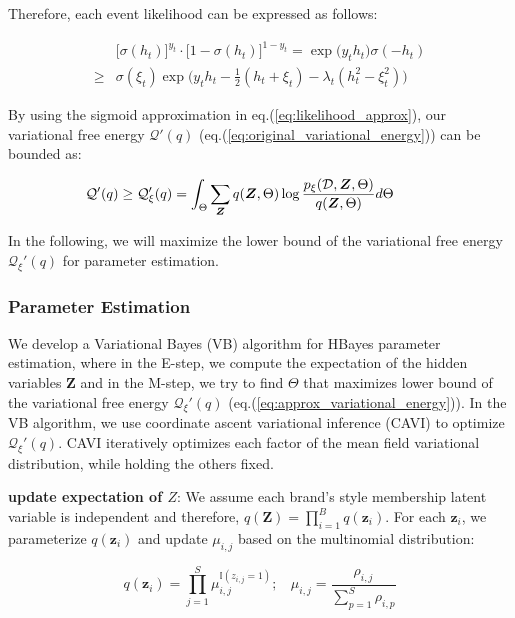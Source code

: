 Therefore, each event likelihood can be expressed as follows:

\begin{align}
\label{eq:likelihood_approx}
& \big[\sigma(h_t)\big]^{y_t} \cdot  \big[1-\sigma(h_t) \big]^{1-y_t} = \exp\big( y_t h_t \big) \sigma(-h_t) \nonumber \\
\geq & \sigma(\xi_t)\exp \big(y_t h_t-\frac{1}{2}(h_t+\xi_t)-\lambda_t(h_t^2-\xi_t^2) \big)
\end{align}

By using the sigmoid approximation in eq.(\ref{eq:likelihood_approx}), our variational free energy $\mathcal{Q}'(q)$ (eq.(\ref{eq:original_variational_energy})) can be bounded as:

\begin{equation}
\label{eq:approx_variational_energy}
\hskip -1cm \mathcal{Q}'(q) \geq \mathcal{Q}'_{\xi}(q) = \int_\Theta \sum_{\bm{Z}} q(\bm{Z},\Theta) \log\frac{p_{\xi}(\mathcal{D},\bm{Z},\Theta)}{q(\bm{Z},\Theta)}d\Theta
\end{equation}

In the following, we will maximize the lower bound of the variational free energy $\mathcal{Q}_{\xi}'(q) $ for parameter estimation.

\subsubsection{Parameter Estimation}
\label{sec:param}

We develop a Variational Bayes (VB) algorithm for HBayes parameter estimation, where in the E-step, we compute the expectation of the hidden variables $\mathbf{Z}$ and in the M-step, we try to find $\Theta$ that maximizes lower bound of the variational free energy $\mathcal{Q}_{\xi}'(q)$ (eq.(\ref{eq:approx_variational_energy})). In the VB algorithm, we use coordinate ascent variational inference (CAVI) \cite{bishop2006pattern} to optimize $\mathcal{Q}_{\xi}'(q)$. CAVI iteratively optimizes each factor of the mean field variational distribution, while holding the others fixed.

\noindent \textbf{update expectation of $Z$}:
We assume each brand's style membership latent variable is independent and therefore, $q(\mathbf{Z}) = \prod_{i=1}^B q(\mathbf{z}_i)$. For each $\mathbf{z}_i$, we parameterize $q(\mathbf{z}_i)$ and update $\mu_{i,j}$ based on the multinomial distribution:

$$q(\mathbf{z}_i) = \prod_{j=1}^S \mu_{i,j}^{\mathbb{I}(z_{i,j}=1)}; ~~~~\mu_{i,j} =  \frac{\rho_{i,j}}{\sum_{p=1}^S\rho_{i,p}}$$

